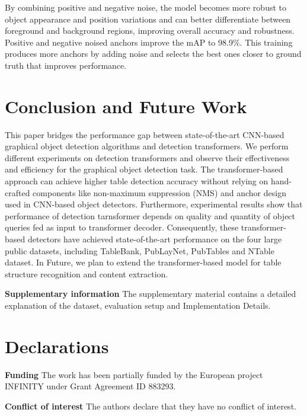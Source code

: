 \documentclass[sn-mathphys]{sn-jnl}\jyear{2021}\theoremstyle{thmstyleone}\newtheorem{theorem}{Theorem}\newtheorem{proposition}[theorem]{Proposition}\theoremstyle{thmstyletwo}\newtheorem{example}{Example}\newtheorem{remark}{Remark}\theoremstyle{thmstylethree}\newtheorem{definition}{Definition}\usepackage{amsmath}
\begin{document}
 By combining positive and negative noise, the model becomes more robust to object appearance and position variations and can better differentiate between foreground and background regions, improving overall accuracy and robustness. Positive and negative noised anchors improve the mAP to 98.9$\%$. This training produces more anchors by adding noise and selects the best ones closer to ground truth that improves performance.\\

\section{Conclusion and Future Work}
\label{sec:conclusion}
This paper bridges the performance gap between state-of-the-art CNN-based graphical object detection algorithms and detection transformers. We perform different experiments on detection transformers and observe their effectiveness and efficiency for the graphical object detection task. The transformer-based approach can achieve higher table detection accuracy without relying on hand-crafted components like non-maximum suppression (NMS) and anchor design used in CNN-based object detectors. Furthermore, experimental results show that performance of detection tarnsformer depends on quality and quantity of object queries fed as input to transformer decoder. Consequently, these transformer-based detectors have achieved state-of-the-art performance on the four large public datasets, including TableBank, PubLayNet, PubTables and NTable dataset. In Future, we plan to extend the transformer-based model for table structure recognition and content extraction.

\noindent\textbf{Supplementary information}
The supplementary material contains a detailed explanation of the dataset,
evaluation setup and Implementation Details.

\section*{Declarations}
\noindent\textbf{Funding} The work has been partially funded by the European project INFINITY under Grant Agreement ID 883293.\par
\noindent\textbf{Conflict of interest} The authors declare that they have no conflict of interest.

\end{document}
